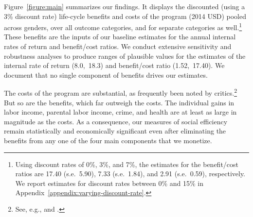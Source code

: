 \noindent Figure~\ref{figure:main} summarizes our findings. It displays the discounted (using a 3\% discount rate) life-cycle benefits and costs of the program (2014 USD) pooled across genders, over all outcome categories, and for separate categories as well.\footnote{Using discount rates of 0\%, 3\%, and 7\%, the estimates for the benefit/cost ratios are 17.40 (s.e.\ 5.90), 7.33 (s.e.\ 1.84), and 2.91 (s.e.\ 0.59), respectively. We report estimates for discount rates between 0\% and 15\% in  Appendix~\ref{appendix:varying-discount-rate}.} These benefits are the inputs of our baseline estimates for the annual internal rates of return and benefit/cost ratios. We conduct extensive sensitivity and robustness analyses to produce ranges of plausible values for the estimates of the internal rate of return (8.0,\ 18.3) and benefit/cost ratio (1.52,\ 17.40). We document that no single component of benefits drives our estimates.

The costs of the program are substantial, as frequently been noted by critics.\footnote{See, e.g., \citet{Fox_News_2014_Head_Start_Effects} and \citet{Whitehurst_2014_Senate_Testimony}.} But so are the benefits, which far outweigh the costs. The individual gains in labor income, parental labor income, crime, and health are at least as large in magnitude as the costs. As a consequence, our measures of social efficiency remain statistically and economically significant even after eliminating the benefits from any one of the four main components that we monetize.

